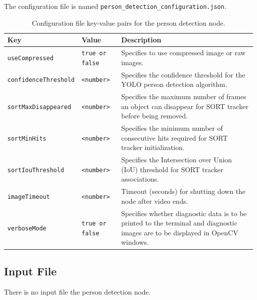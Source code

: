 \documentclass{CSSRforAfrica}
\begin{document}
The configuration file is named \texttt{person\_detection\_configuration.json}. 

\begin{table}[h!]
	\centering
	\begin{tabularx}{\linewidth}{| l | l | X|}
		\hline
		\rowcolor{blue!20} %
		\textbf{Key} & \textbf{Value} & \textbf{Description} \\
		\hline
		{\footnotesize \texttt{useCompressed}}  & {\footnotesize \texttt{true or false}}     & {\small Specifies to use compressed image or raw images.} \\
		\hline
		{\footnotesize \texttt{confidenceThreshold}}  & {\footnotesize \texttt{<number>}}     & {\small Specifies the confidence threshold for the YOLO person detection algorithm.} \\
		\hline
		{\footnotesize \texttt{sortMaxDisappeared}}  & {\footnotesize \texttt{<number>}}     & {\small Specifies the maximum number of frames an object can disappear for SORT tracker before being removed.} \\
		\hline
		{\footnotesize \texttt{sortMinHits}}  & {\footnotesize \texttt{<number>}}     & {\small Specifies the minimum number of consecutive hits required for SORT tracker initialization.} \\
		\hline
		{\footnotesize \texttt{sortIouThreshold}} & {\footnotesize \texttt{<number>}}     & {\small Specifies the Intersection over Union (IoU) threshold for SORT tracker associations.} \\
		\hline
		{\footnotesize \texttt{imageTimeout}} & {\footnotesize \texttt{<number>}}     & {\small Timeout (seconds) for shutting down the node after video ends.} \\
		\hline
		{\footnotesize \texttt{verboseMode}}  & {\footnotesize \texttt{true or false}}     & {\small Specifies whether diagnostic data is to be printed to the terminal and diagnostic images are to be displayed in OpenCV windows.} \\
		\hline
	\end{tabularx}
	\caption{Configuration file key-value pairs for the person detection node.}
\label{tab:person_detection}
\end{table}

\subsection*{Input File}
There is no input file the person detection node.
\end{document}
